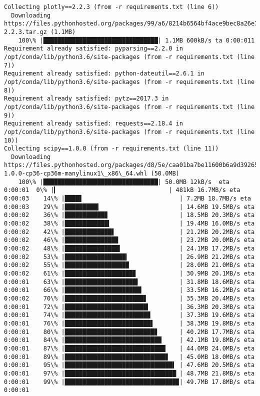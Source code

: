 \documentclass[11pt]{article}
\begin{document}
\begin{Verbatim}[commandchars=\\\{\}]
Collecting plotly==2.2.3 (from -r requirements.txt (line 6))
  Downloading https://files.pythonhosted.org/packages/99/a6/8214b6564bf4ace9bec8a26e7f89832792be582c042c47c912d3201328a0/plotly-2.2.3.tar.gz (1.1MB)
    100\% |████████████████████████████████| 1.1MB 600kB/s ta 0:00:011
Requirement already satisfied: pyparsing==2.2.0 in /opt/conda/lib/python3.6/site-packages (from -r requirements.txt (line 7))
Requirement already satisfied: python-dateutil==2.6.1 in /opt/conda/lib/python3.6/site-packages (from -r requirements.txt (line 8))
Requirement already satisfied: pytz==2017.3 in /opt/conda/lib/python3.6/site-packages (from -r requirements.txt (line 9))
Requirement already satisfied: requests==2.18.4 in /opt/conda/lib/python3.6/site-packages (from -r requirements.txt (line 10))
Collecting scipy==1.0.0 (from -r requirements.txt (line 11))
  Downloading https://files.pythonhosted.org/packages/d8/5e/caa01ba7be11600b6a9d39265440d7b3be3d69206da887c42bef049521f2/scipy-1.0.0-cp36-cp36m-manylinux1\_x86\_64.whl (50.0MB)
    100\% |████████████████████████████████| 50.0MB 12kB/s  eta 0:00:01  0\% |▎                               | 481kB 16.7MB/s eta 0:00:03    14\% |████▋                           | 7.2MB 18.7MB/s eta 0:00:03    29\% |█████████▍                      | 14.6MB 19.5MB/s eta 0:00:02    36\% |███████████▉                    | 18.5MB 20.3MB/s eta 0:00:02    38\% |████████████▍                   | 19.4MB 16.0MB/s eta 0:00:02    42\% |█████████████▋                  | 21.2MB 20.2MB/s eta 0:00:02    46\% |██████████████▉                 | 23.2MB 20.0MB/s eta 0:00:02    48\% |███████████████▍                | 24.1MB 17.2MB/s eta 0:00:02    53\% |█████████████████▎              | 26.9MB 21.2MB/s eta 0:00:02    55\% |█████████████████▉              | 28.0MB 21.0MB/s eta 0:00:02    61\% |███████████████████▊            | 30.9MB 20.1MB/s eta 0:00:01    63\% |████████████████████▍           | 31.8MB 18.6MB/s eta 0:00:01    66\% |█████████████████████▍          | 33.5MB 16.2MB/s eta 0:00:02    70\% |██████████████████████▋         | 35.3MB 20.4MB/s eta 0:00:01    72\% |███████████████████████▎        | 36.3MB 20.3MB/s eta 0:00:01    74\% |███████████████████████▉        | 37.3MB 19.6MB/s eta 0:00:01    76\% |████████████████████████▌       | 38.3MB 19.8MB/s eta 0:00:01    80\% |█████████████████████████▊      | 40.2MB 17.7MB/s eta 0:00:01    84\% |███████████████████████████     | 42.1MB 19.8MB/s eta 0:00:01    87\% |████████████████████████████▏   | 44.0MB 24.0MB/s eta 0:00:01    89\% |████████████████████████████▊   | 45.0MB 18.0MB/s eta 0:00:01    95\% |██████████████████████████████▌ | 47.6MB 20.5MB/s eta 0:00:01    97\% |███████████████████████████████▏| 48.7MB 21.8MB/s eta 0:00:01    99\% |███████████████████████████████▉| 49.7MB 17.8MB/s eta 0:00:01

\end{Verbatim}
\end{document}
